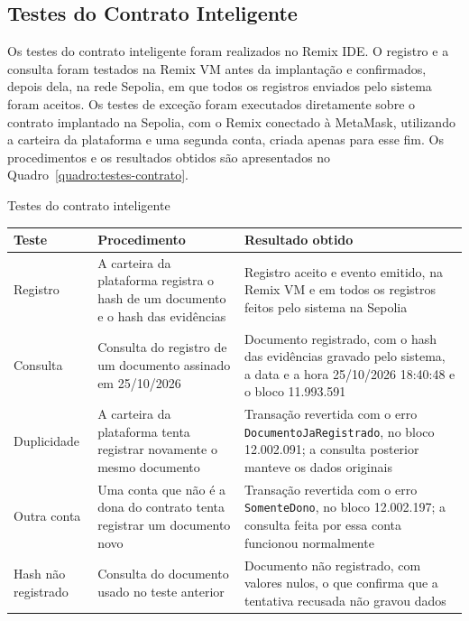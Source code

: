 \documentclass[
    12pt,
    a4paper,
    oneside,
    chapter=TITLE,
    section=TITLE,
    subsection=TITLE,
    subsubsection=TITLE,
    sumario=tradicional,
    english,
    brazil
]{abntex2}
\begin{document}
\subsection{Testes do Contrato Inteligente}
\label{sec:res-contrato}

Os testes do contrato inteligente foram realizados no Remix IDE. O registro e a consulta foram testados na Remix VM antes da implantação e confirmados, depois dela, na rede Sepolia, em que todos os registros enviados pelo sistema foram aceitos. Os testes de exceção foram executados diretamente sobre o contrato implantado na Sepolia, com o Remix conectado à MetaMask, utilizando a carteira da plataforma e uma segunda conta, criada apenas para esse fim. Os procedimentos e os resultados obtidos são apresentados no Quadro~\ref{quadro:testes-contrato}.

\begin{quadro}[htb]
    \caption{Testes do contrato inteligente}
    \label{quadro:testes-contrato}
    \centering
    \small
    \begin{tabular}{L{2.5cm}L{5.3cm}L{6.7cm}}
        \toprule
        \textbf{Teste} & \textbf{Procedimento} & \textbf{Resultado obtido} \\
        \midrule
        Registro & A carteira da plataforma registra o hash de um documento e o hash das evidências & Registro aceito e evento emitido, na Remix VM e em todos os registros feitos pelo sistema na Sepolia \\
        Consulta & Consulta do registro de um documento assinado em 25/10/2026 & Documento registrado, com o hash das evidências gravado pelo sistema, a data e a hora 25/10/2026 18:40:48 e o bloco 11.993.591 \\
        Duplicidade & A carteira da plataforma tenta registrar novamente o mesmo documento & Transação revertida com o erro \texttt{DocumentoJaRegistrado}, no bloco 12.002.091; a consulta posterior manteve os dados originais \\
        Outra conta & Uma conta que não é a dona do contrato tenta registrar um documento novo & Transação revertida com o erro \texttt{SomenteDono}, no bloco 12.002.197; a consulta feita por essa conta funcionou normalmente \\
        Hash não registrado & Consulta do documento usado no teste anterior & Documento não registrado, com valores nulos, o que confirma que a tentativa recusada não gravou dados \\
        \bottomrule
    \end{tabular}
\end{quadro}
\end{document}
